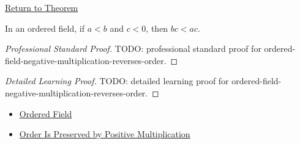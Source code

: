 \newpage
{}
\label{prf:ordered-field-negative-multiplication-reverses-order}

\begin{remark*}[Return]
\hyperref[thm:ordered-field-negative-multiplication-reverses-order]{Return to Theorem}
\end{remark*}

\begin{theorem*}
In an ordered field, if $a<b$ and $c<0$, then $bc<ac$.
\end{theorem*}

\begin{proof}[Professional Standard Proof]
\LRAProofBodyStart
TODO: professional standard proof for ordered-field-negative-multiplication-reverses-order.
\end{proof}

\begin{proof}[Detailed Learning Proof]
\LRAProofBodyStart
TODO: detailed learning proof for ordered-field-negative-multiplication-reverses-order.
\end{proof}

\begin{remark*}
\end{remark*}

\begin{dependencies}
\begin{itemize}
  \item \hyperref[def:ordered-field]{Ordered Field}
  \item \hyperref[thm:ordered-field-positive-multiplication-preserves-order]{Order Is Preserved by Positive Multiplication}
\end{itemize}
\end{dependencies}

\clearpage
